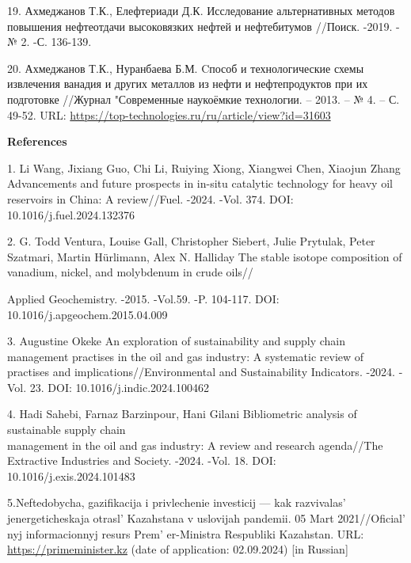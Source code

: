 \begin{references}
19. Ахмеджанов Т.К., Елефтериади Д.К. Исследование альтернативных
методов повышения нефтеотдачи высоковязких нефтей и нефтебитумов
//Поиск. -2019. -№ 2. -С. 136-139.

20. Ахмеджанов Т.К., Нуранбаева Б.М. Cпособ и технологические схемы
извлечения ванадия и других металлов из нефти и нефтепродуктов при их
подготовке //Журнал "Современные наукоёмкие технологии. -- 2013. -- № 4.
-- С. 49-52. URL:
\url{https://top-technologies.ru/ru/article/view?id=31603}
\end{references}

\begin{center}
  {\bfseries References}
  \end{center}
  \begin{references}


1. Li Wang, Jixiang Guo, Chi Li, Ruiying Xiong, Xiangwei Chen, Xiaojun
Zhang Advancements and future prospects in in-situ catalytic technology
for heavy oil reservoirs in China: A review//Fuel. -2024. -Vol. 374.
DOI: 10.1016/j.fuel.2024.132376

2. G. Todd Ventura, Louise Gall, Christopher Siebert, Julie Prytulak,
Peter Szatmari, Martin Hürlimann, Alex N. Halliday The stable isotope
composition of vanadium, nickel, and molybdenum in crude oils//

Applied Geochemistry. -2015. -Vol.59. -P. 104-117. DOI:
10.1016/j.apgeochem.2015.04.009

3. Augustine Okeke An exploration of sustainability and supply chain
management practises in the oil and gas industry: A systematic review of
practises and implications//Environmental and Sustainability Indicators.
-2024. -Vol. 23. DOI: 10.1016/j.indic.2024.100462

4. Hadi Sahebi, Farnaz Barzinpour, Hani Gilani Bibliometric analysis of
sustainable supply chain \\management in the oil and gas industry: A
review and research agenda//The Extractive Industries and Society.
-2024. -Vol. 18. DOI: 10.1016/j.exis.2024.101483

5.Neftedobycha, gazifikacija i privlechenie investicij --- kak
razvivalas'{} jenergeticheskaja otrasl'{}
Kazahstana v uslovijah pandemii. 05 Mart
2021//Oficial' nyj informacionnyj resurs
Prem' er-Ministra Respubliki Kazahstan. URL:
\href{https://primeminister.kz/ru/news/neftedobycha-gazifikaciya-i-privlechenie-investiciy-kak-razvivalas-energeticheskaya-otrasl-kazahstana-v-usloviyah-pandemii-52034}{https://primeminister.kz}
(date of application: 02.09.2024) {[}in Russian{]}


\end{references}
